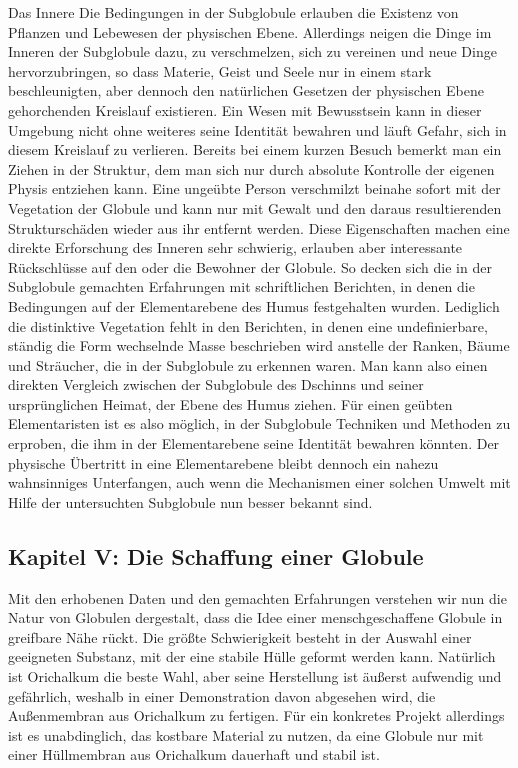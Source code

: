 \documentclass[a5paper,8pt]{book}
\begin{document}
Das Innere
Die Bedingungen in der Subglobule erlauben die Existenz von Pflanzen und Lebewesen der physischen Ebene. Allerdings neigen 
die Dinge im Inneren der Subglobule dazu, zu verschmelzen, sich zu vereinen und neue Dinge hervorzubringen, so dass Materie, 
Geist und Seele nur in einem stark beschleunigten, aber dennoch den natürlichen Gesetzen der physischen Ebene gehorchenden
Kreislauf existieren. Ein Wesen mit Bewusstsein kann in dieser Umgebung nicht ohne weiteres seine Identität bewahren und 
läuft Gefahr, sich in diesem Kreislauf zu verlieren. Bereits bei einem kurzen Besuch bemerkt man ein Ziehen in der Struktur, dem man sich nur durch absolute Kontrolle der eigenen Physis entziehen kann. Eine ungeübte Person verschmilzt beinahe sofort mit der Vegetation der Globule und kann nur mit Gewalt und den daraus resultierenden Strukturschäden wieder aus ihr entfernt werden. 
Diese Eigenschaften machen eine direkte Erforschung des Inneren sehr schwierig, erlauben aber interessante Rückschlüsse auf 
den oder die Bewohner der Globule. So decken sich die in der Subglobule gemachten Erfahrungen mit schriftlichen Berichten, 
in denen die Bedingungen auf der Elementarebene des Humus festgehalten wurden. Lediglich die distinktive Vegetation fehlt 
in den Berichten, in denen eine undefinierbare, ständig die Form wechselnde Masse beschrieben wird anstelle der Ranken, 
Bäume und Sträucher, die in der Subglobule zu erkennen waren. Man kann also einen direkten Vergleich zwischen der 
Subglobule des Dschinns und seiner ursprünglichen Heimat, der Ebene des Humus ziehen. Für einen geübten Elementaristen ist 
es also möglich, in der Subglobule Techniken und Methoden zu erproben, die ihm in der Elementarebene seine Identität 
bewahren könnten. Der physische Übertritt in eine Elementarebene bleibt dennoch ein nahezu wahnsinniges Unterfangen, auch 
wenn die Mechanismen einer solchen Umwelt mit Hilfe der untersuchten Subglobule nun besser bekannt sind. 


\subsection{Kapitel V: Die Schaffung einer Globule}

Mit den erhobenen Daten und den gemachten Erfahrungen verstehen wir nun die Natur von Globulen dergestalt, dass die Idee 
einer menschgeschaffene Globule in greifbare Nähe rückt. 
Die größte Schwierigkeit besteht in der Auswahl einer geeigneten Substanz, mit der eine stabile Hülle geformt werden kann. 
Natürlich ist Orichalkum die beste Wahl, aber seine Herstellung ist äußerst aufwendig und gefährlich, weshalb in einer 
Demonstration davon abgesehen wird, die Außenmembran aus Orichalkum zu fertigen. Für ein konkretes Projekt allerdings ist 
es unabdinglich, das kostbare Material zu nutzen, da eine Globule nur mit einer Hüllmembran aus Orichalkum dauerhaft und 
stabil ist. 
\end{document}
